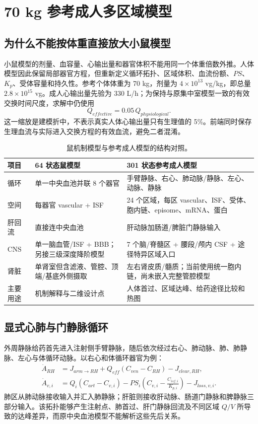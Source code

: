 \documentclass[UTF8,11pt,a4paper]{ctexart}
\begin{document}
\section{70 kg 参考成人多区域模型}

\subsection{为什么不能按体重直接放大小鼠模型}
小鼠模型的剂量、血容量、心输出量和器官体积不能用同一个体重倍数外推。人体模型因此保留局部器官方程，但重新定义循环拓扑、区域体积、血流份额、$PS$、$K_p$、受体容量和持久性。参考个体体重为 70 kg，剂量为 $4\times10^{13}$ vg/kg，即总量 $2.8\times10^{15}$ vg。成人心输出量先验为 $330$ L/h；为保持与原集中室模型一致的有效交换时间尺度，求解中仍使用
\begin{equation}
Q_{effective}=0.05\,Q_{physiological}.
\end{equation}
这一缩放是建模折中，不表示真实人体心输出量只有生理值的 5\%。前端同时保存生理血流与实际进入交换方程的有效血流，避免二者混淆。

\begin{table}[H]
\centering
\caption{鼠机制模型与参考成人模型的结构对照。}
\begin{tabularx}{\textwidth}{p{}XX}
\toprule
项目 & 64 状态鼠模型 & 301 状态参考成人模型 \\
\midrule
循环 & 单一中央血池并联 8 个器官 & 手臂静脉、右心、肺动脉/静脉、左心、动脉、静脉 \\
空间 & 每器官 vascular + ISF & 24 个区域，每区 vascular、ISF、受体、胞内链、episome、mRNA、蛋白 \\
肝回流 & 直接连中央血池 & 肝动脉加肠道/脾脏门静脉输入 \\
CNS & 单一脑血管/ISF + BBB；另接三级深度降阶模型 & 7 个脑/脊髓区 + 腰段/颅内 CSF + 途径特异区域入口 \\
肾脏 & 单肾室但含滤液、管腔、顶端/基底外侧摄取 & 左右肾皮质/髓质；当前使用统一胞内链，尚未嵌入完整管腔模型 \\
主要用途 & 机制解释与二维设计点 & 人体首过、区域达峰、给药途径比较和热图 \\
\bottomrule
\end{tabularx}
\end{table}

\subsection{显式心肺与门静脉循环}
外周静脉给药首先进入注射侧手臂静脉，随后依次经过右心、肺动脉、肺、肺静脉、左心与体循环动脉。以右心和体循环器官为例：
\begin{align}
\dot A_{RH}&=J_{arm\to RH}+Q_{eff}(C_{ven}-C_{RH})-J_{clear,RH},\\
\dot A_{v,i}&=Q_i(C_{art}-C_{v,i})-PS_i\left(C_{v,i}-\frac{C_{isf,i}}{K_{p,i}}\right)-J_{loss,v,i}.
\end{align}
肺区从肺动脉接收输入并汇入肺静脉；肝脏则接收肝动脉、肠道门静脉和脾静脉三部分输入。该拓扑能够产生注射点、肺首过、肝门静脉回流及不同区域 $Q/V$ 所导致的达峰差异，而原中央血池模型不能解析这些先后关系。
\end{document}
